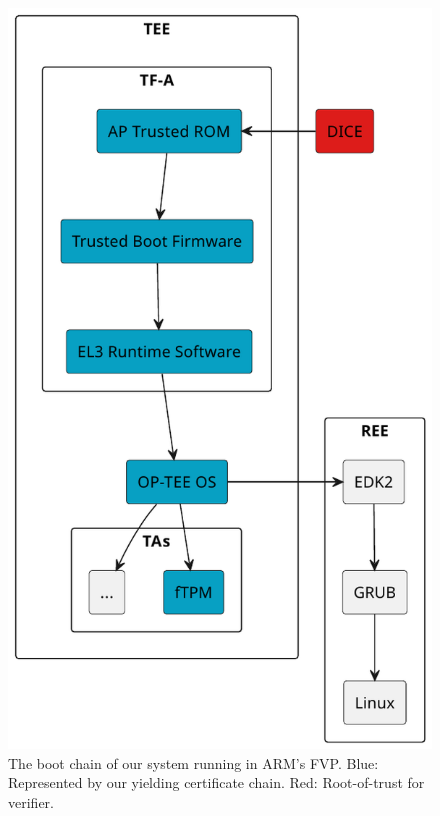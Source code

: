 \begin{figure}[htpb]
  \centering
  \includegraphics[width=0.5\linewidth]{figures/boot-chain.pdf}
  \caption{The boot chain of our system running in ARM's FVP\@. Blue: Represented by our yielding certificate chain. Red: Root-of-trust for verifier.}\label{fig:boot_chain}
\end{figure}
